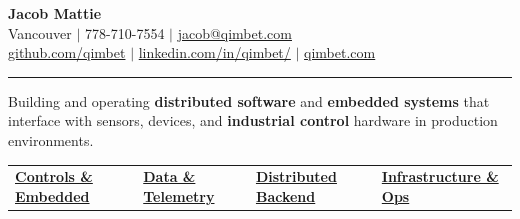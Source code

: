 \documentclass[a4paper,10pt]{article}
\begin{document}
	\begin{center}
		\vspace{-2.05mm}
		{\huge \bfseries Jacob Mattie} \\[0.75em]
		Vancouver $|$ 778-710-7554 $|$ 
		\href{mailto:jacob@qimbet.com}{jacob@qimbet.com} \\
		[0.15em]
		
		\href{https://github.com/qimbet}{github.com/qimbet} $|$ 
		\href{https://www.linkedin.com/in/qimbet/}{linkedin.com/in/qimbet/}  $|$
		\href{www.qimbet.com}{qimbet.com}
		

		\noindent\rule{\textwidth}{0.4pt}

		\vspace{2.05mm}

		Building and operating \textbf{distributed software} and \textbf{embedded systems} that interface with sensors, devices, and \textbf{industrial control} hardware in production environments.
		
		
		\vspace{1em}
		
		\noindent
		


		
		\begin{tabularx}{\linewidth}{@{}X|X|X|X@{}}
			
			\textbf{\underline{Controls \& Embedded}} &
			\textbf{\underline{Data \& Telemetry}} &
			\textbf{\underline{Distributed Backend}} &
			\textbf{\underline{Infrastructure \& Ops}} \\
			

\end{tabularx}
\end{center}
\end{document}
